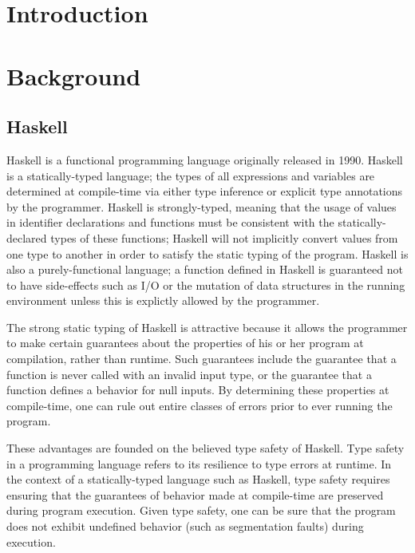 \documentclass{sig-alternate}
\begin{document}

\section{Introduction}
\label{sec:intro}

\section{Background}
\label{sec:background}

\subsection{Haskell}
\label{sec:background-haskell}

Haskell is a functional programming language originally released in 1990. Haskell is a statically-typed language; the types of all expressions and variables are determined at compile-time via either type inference or explicit type annotations by the programmer. Haskell is strongly-typed, meaning that the usage of values in identifier declarations and functions must be consistent with the statically-declared types of these functions; Haskell will not implicitly convert values from one type to another in order to satisfy the static typing of the program. Haskell is also a purely-functional language; a function defined in Haskell is guaranteed not to have side-effects such as I/O or the mutation of data structures in the running environment unless this is explictly allowed by the programmer. 

The strong static typing of Haskell is attractive because it allows the programmer to make certain guarantees about the properties of his or her program at compilation, rather than runtime. Such guarantees include the guarantee that a function is never called with an invalid input type, or the guarantee that a function defines a behavior for null inputs. By determining these properties at compile-time, one can rule out entire classes of errors prior to ever running the program.

These advantages are founded on the believed type safety of Haskell. Type safety in a programming language refers to its resilience to type errors at runtime. In the context of a statically-typed language such as Haskell, type safety requires ensuring that the guarantees of behavior made at compile-time are preserved during program execution. Given type safety, one can be sure that the program does not exhibit undefined behavior (such as segmentation faults) during execution.
\end{document}
